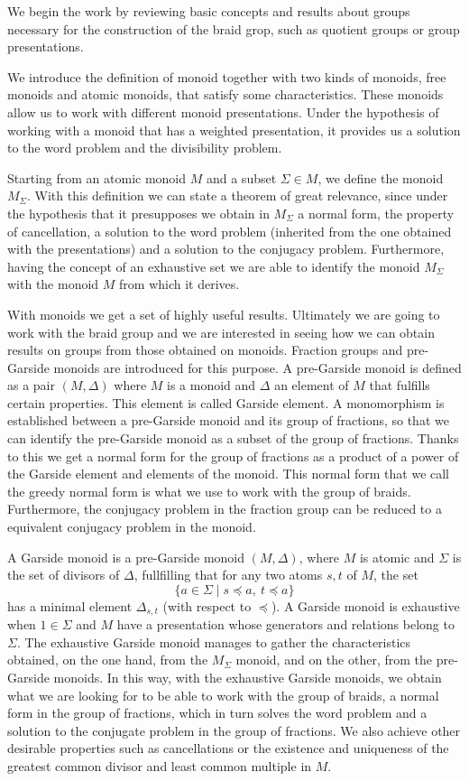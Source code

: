 \documentclass[12pt]{book}
\theoremstyle{definition}
\begin{document}
We begin the work by reviewing basic concepts and results about groups necessary for the construction of the braid grop, such as quotient groups or group presentations.

We introduce the definition of monoid together with two kinds of monoids, free monoids and atomic monoids, that satisfy some characteristics. These monoids allow us to work with different monoid presentations. Under the hypothesis of working with a monoid that has a weighted presentation, it provides us a solution to the word problem and the divisibility problem.

Starting from an atomic monoid $M$ and a subset $\Sigma\in M$, we define the monoid $M_\Sigma$. With this definition we can state a theorem of great relevance, since under the hypothesis that it presupposes we obtain in $M_\Sigma$ a normal form, the property of cancellation, a solution to the word problem (inherited from the one obtained with the presentations) and a solution to the conjugacy problem. Furthermore, having the concept of an exhaustive set we are able to identify the monoid $M_\Sigma$ with the monoid $M$ from which it derives.

With monoids we get a set of highly useful results. Ultimately we are going to work with the braid group and we are interested in seeing how we can obtain results on groups from those obtained on monoids. Fraction groups and pre-Garside monoids are introduced for this purpose. A pre-Garside monoid is defined as a pair $(M, \Delta)$ where $M$ is a monoid and $\Delta$ an element of $M$ that fulfills certain properties. This element is called Garside element. A monomorphism is established between a pre-Garside monoid and its group of fractions, so that we can identify the pre-Garside monoid as a subset of the group of fractions. Thanks to this we get a normal form for the group of fractions as a product of a power of the Garside element and elements of the monoid. This normal form that we call the greedy normal form is what we use to work with the group of braids. Furthermore, the conjugacy problem in the fraction group can be reduced to a equivalent conjugacy problem in the monoid.

A Garside monoid is a pre-Garside monoid $(M,\Delta)$, where $M$ is atomic and $\Sigma$ is the set of divisors of $\Delta$, fullfilling that for any two atoms $s,t$ of $M$, the set
$$\{a\in\Sigma\mid s \preceq a,\ t \preceq a \}$$
has a minimal element $\Delta_{s, t}$ (with respect to $\preceq$).
A Garside monoid is exhaustive when $1\in\Sigma$ and $M$ have a presentation whose generators and relations belong to $ \Sigma $. The exhaustive Garside monoid manages to gather the characteristics obtained, on the one hand, from the $M_\Sigma$ monoid, and on the other, from the pre-Garside monoids. In this way, with the exhaustive Garside monoids, we obtain what we are looking for to be able to work with the group of braids, a normal form in the group of fractions, which in turn solves the word problem and a solution to the conjugate problem in the group of fractions. We also achieve other desirable properties such as cancellations or the existence and uniqueness of the greatest common divisor and least common multiple in $M$.
\end{document}
